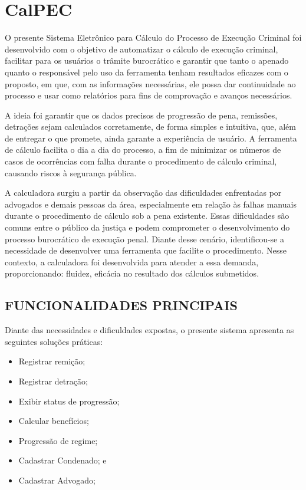 \chapter{CalPEC}
O presente Sistema Eletrônico para Cálculo do Processo de Execução Criminal foi desenvolvido com o objetivo de automatizar o cálculo de execução criminal, facilitar para os usuários o trâmite burocrático e garantir que tanto o apenado quanto o responsável pelo uso da ferramenta tenham resultados eficazes com o proposto, em que, com as informações necessárias, ele possa dar continuidade ao processo e usar como relatórios para fins de comprovação e avanços necessários.

A ideia foi garantir que os dados precisos de progressão de pena, remissões, detrações sejam calculados corretamente, de forma simples e intuitiva, que, além de entregar o que promete, ainda garante a experiência de usuário. A ferramenta de cálculo facilita o dia a dia do processo, a fim de minimizar os números de casos de ocorrências com falha durante o procedimento de cálculo criminal, causando riscos à segurança pública.

A calculadora surgiu a partir da observação das dificuldades enfrentadas por advogados e demais pessoas da área, especialmente em relação às falhas manuais durante o procedimento de cálculo sob a pena existente. Essas dificuldades são comuns entre o público da justiça e podem comprometer o desenvolvimento do processo burocrático de execução penal. Diante desse cenário, identificou-se a necessidade de desenvolver uma ferramenta que facilite o procedimento. Nesse contexto, a calculadora foi desenvolvida para atender a essa demanda, proporcionando: fluidez, eficácia no resultado dos cálculos submetidos.

\section{FUNCIONALIDADES PRINCIPAIS}
Diante das necessidades e dificuldades expostas, o presente sistema apresenta as seguintes soluções práticas: 

\begin{itemize}
    \item Registrar remição;
    \item Registrar detração;
    \item Exibir status de progressão;
    \item Calcular benefícios;
    \item Progressão de regime; 
    \item Cadastrar Condenado; e
    \item Cadastrar Advogado;
\end{itemize}

